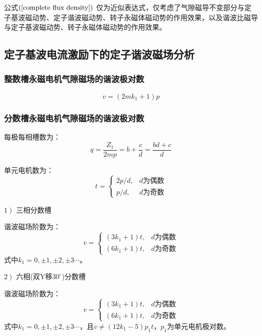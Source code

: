 \documentclass[11pt,a4paper]{article}
\begin{document}
公式$ \left( \ref{complete flux density} \right) $ 仅为近似表达式，仅考虑了气隙磁导不变部分与定子基波磁动势、定子谐波磁动势、转子永磁体磁动势的作用效果，以及谐波比磁导与定子基波磁动势、转子永磁体磁动势的作用效果。

\subsection{定子基波电流激励下的定子谐波磁场分析}
\subsubsection{整数槽永磁电机气隙磁场的谐波极对数}
\begin{equation}v=\left(2 m k_{1}+1\right) p\end{equation}
\subsubsection{分数槽永磁电机气隙磁场的谐波极对数}
每极每相槽数为：
\begin{equation}q=\frac{Z_{1}}{2 m p}=b+\frac{c}{d}=\frac{b d+c}{d}\end{equation} \par

单元电机数为：
\begin{equation}
t=
\left\lbrace 
\begin{array}{cc}
2p/d, & d\mbox{为偶数} \\
p/d, & d\mbox{为奇数}
\end{array}
\right.
\end{equation}\par

$ \left. 1\right)  $ 三相分数槽 \par
谐波磁场阶数为：
\begin{equation}
v=
\left\lbrace 
\begin{array}{cc}
\left( 3k_{1}+1 \right) t, & d\mbox{为偶数} \\
\left( 6k_{1}+1 \right) t, & d\mbox{为奇数}
\end{array}
\right.
\end{equation}
式中$ k_{1}=0, \pm1, \pm2, \pm3\cdots $。

$ \left. 2\right)  $ 六相(双Y移$30^\circ$)分数槽 \par
谐波磁场阶数为：
\begin{equation} \label{eq:六相谐波阶数}
v=
\left\lbrace 
\begin{array}{cc}
\left( 3k_{1}+1 \right) t, & d\mbox{为偶数} \\
\left( 6k_{1}+1 \right) t, & d\mbox{为奇数}
\end{array}
\right.
\end{equation}
式中$ k_{1}=0, \pm1, \pm2, \pm3\cdots $，且$ v\neq\left( 12k_{1}-5\right) p_{1}t $，$ p_{1} $为单元电机极对数。
\end{document}
